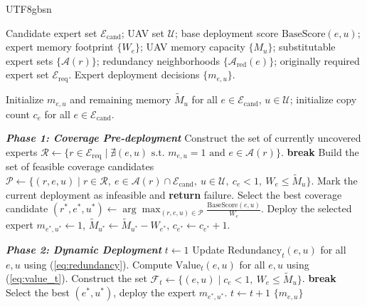 \documentclass[journal]{IEEEtran}
\begin{document}
\begin{CJK*}{UTF8}{gbsn}
\begin{algorithm}[t]
\caption{Dynamic Expert Placement Algorithm}
\label{alg:greedy_placement}
\begin{algorithmic}[1]
\REQUIRE Candidate expert set $\mathcal{E}_{\mathrm{cand}}$;  
         UAV set $\mathcal{U}$;  
         base deployment score $\mathrm{BaseScore}(e,u)$;  
         expert memory footprint $\{W_e\}$;  
         UAV memory capacity $\{M_u\}$;  
         substitutable expert sets $\{\mathcal{A}(r)\}$;  
         redundancy neighborhoods $\{\mathcal{A}_{\mathrm{red}}(e)\}$;  
         originally required expert set $\mathcal{E}_{\mathrm{req}}$.
\ENSURE Expert deployment decisions $\{m_{e,u}\}$.

\STATE Initialize $m_{e,u}$ and remaining memory $\tilde{M}_u$ for all $e \in \mathcal{E}_{\mathrm{cand}}$, $u \in \mathcal{U}$; initialize copy count $c_e$ for all $e \in \mathcal{E}_{\mathrm{cand}}$.

\STATE \textbf{\it Phase 1: Coverage Pre-deployment}
    \STATE Construct the set of currently uncovered experts
           $\mathcal{R} \leftarrow \{ r \in \mathcal{E}_{\mathrm{req}} \mid \nexists (e,u) \text{ s.t. } m_{e,u}=1 \text{ and } e \in \mathcal{A}(r) \}$.
        \STATE \textbf{break}
    \ENDIF
    \STATE Build the set of feasible coverage candidates
           $\mathcal{P} \leftarrow \{ (r,e,u) \mid r \in \mathcal{R},\ e \in \mathcal{A}(r) \cap \mathcal{E}_{\mathrm{cand}},\ u \in \mathcal{U},\ c_e < 1,\ W_e \le \tilde{M}_u \}$.
        \STATE Mark the current deployment as infeasible and \textbf{return} failure.
    \ENDIF
    \STATE Select the best coverage candidate
           $(r^*,e^*,u^*) \leftarrow \arg\max_{(r,e,u) \in \mathcal{P}} \frac{\mathrm{BaseScore}(e,u)}{W_e}$.
    \STATE Deploy the selected expert $m_{e^*,u^*} \leftarrow 1$, $\tilde{M}_{u^*} \leftarrow \tilde{M}_{u^*} - W_{e^*}$, $c_{e^*} \leftarrow c_{e^*} + 1$.
\ENDWHILE

\STATE \textbf{\it Phase 2:  Dynamic Deployment}
\STATE $t \leftarrow 1$
\LOOP
    \STATE Update $\mathrm{Redundancy}_t(e,u)$ for all $e,u$ using (\ref{eq:redundancy}).
    \STATE Compute $\mathrm{Value}_t(e,u)$ for all $e,u$ using (\ref{eq:value_t}).
    \STATE Construct the set
           $\mathcal{F}_t \leftarrow \{ (e,u) \mid c_e < 1,\ W_e \le \tilde{M}_u \}$.
        \STATE \textbf{break}
    \ENDIF
    \STATE Select the best $(e^*,u^*)$, deploy the expert $m_{e^*,u^*}$.
    \STATE $t \leftarrow t + 1$
\ENDLOOP
\RETURN $\{m_{e,u}\}$
\end{algorithmic}
\end{algorithm}


\end{CJK*}
\end{document}
